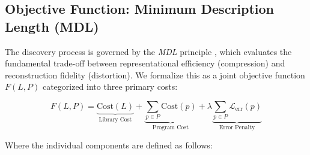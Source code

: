 \documentclass{thesis}
\begin{document}
\subsection{Objective Function: Minimum Description Length (MDL)}\label{sec:mdl_objective}

The discovery process is governed by the \textit{MDL} principle \cite{Rissanen1978}, which evaluates the fundamental trade-off between representational efficiency (compression) and reconstruction fidelity (distortion). We formalize this as a joint objective function $F(L, P)$ categorized into three primary costs:

\begin{equation}
    F(L, P) = \underbrace{\text{Cost}(L)}_{\text{Library Cost}} + \underbrace{\sum_{p \in P} \text{Cost}(p)}_{\text{Program Cost}} + \lambda \underbrace{\sum_{p \in P} \mathcal{L}_{\text{err}}(p)}_{\text{Error Penalty}}
\end{equation}

Where the individual components are defined as follows:
\end{document}

